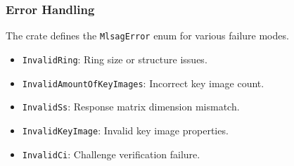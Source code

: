 \subsubsection{Error Handling}

The crate defines the \texttt{MlsagError} enum for various failure modes.  
\begin{itemize}
\item \texttt{InvalidRing}: Ring size or structure issues.  
\item \texttt{InvalidAmountOfKeyImages}: Incorrect key image count.  
\item \texttt{InvalidSs}: Response matrix dimension mismatch.  
\item \texttt{InvalidKeyImage}: Invalid key image properties.  
\item \texttt{InvalidCi}: Challenge verification failure.  
\end{itemize}




